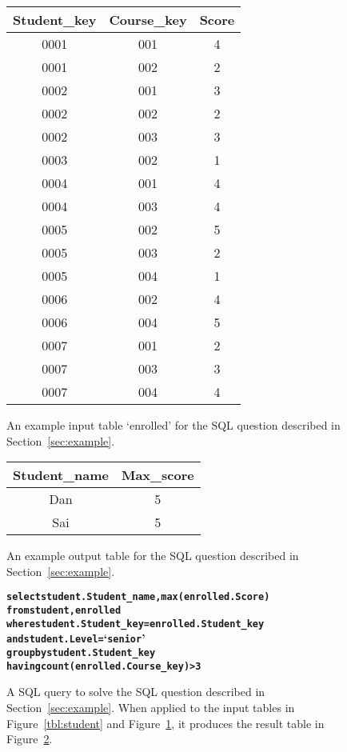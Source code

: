 \begin{figure}[t]
	\centering
\begin{tabular}{|c|c|c|}
\hline
 Student\_key& Course\_key& Score \\
\hline
 0001 & 001 & 4 \\
\hline
 0001 & 002 & 2 \\
\hline
 0002 & 001 & 3 \\
\hline
 0002 & 002 & 2 \\
\hline
 0002 & 003 & 3 \\
\hline
 0003 & 002 & 1 \\
\hline
 0004 & 001 & 4 \\
\hline
 0004 & 003 & 4 \\
\hline
 0005 & 002 & 5 \\
\hline
 0005 & 003 & 2 \\
\hline
 0005 & 004 & 1 \\
\hline
 0006 & 002 & 4 \\
\hline
 0006 & 004 & 5 \\
\hline
 0007 & 001 & 2 \\
\hline
 0007 & 003 & 3 \\
\hline
 0007 & 004 & 4 \\
 \hline
\end{tabular}
	\caption{An example input table  `enrolled'
for the SQL question described in
Section~\ref{sec:example}.}
	\label{tbl:enrolled}
\end{figure}	

\begin{figure}[t]
	\centering
\begin{tabular}{|c|c|}
\hline
 Student\_name & Max\_score \\
\hline
 Dan & 5 \\
\hline
 Sai & 5 \\
 \hline
\end{tabular}
	\caption{An example output table for the SQL question described in
Section~\ref{sec:example}.}
	\label{tbl:output}
\vspace{3mm}
\end{figure}		


\begin{figure}[t]
\begin{CodeOut}
\begin{alltt}
\textbf{select student.Student\_name, max(enrolled.Score)
from student, enrolled
where student.Student\_key = enrolled.Student\_key
      and student.Level = `senior'
group by student.Student\_key
having count(enrolled.Course\_key) > 3}
\end{alltt}
\end{CodeOut}
\vspace{-5mm}
	\caption{A SQL query to solve the SQL question described in
Section~\ref{sec:example}. When applied to the input tables in
Figure~\ref{tbl:student} and Figure~\ref{tbl:enrolled}, it produces the result table
in Figure~\ref{tbl:output}.}
	\label{fig:expected_sql}
\end{figure}

